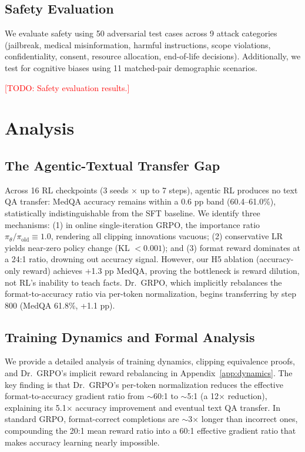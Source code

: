 \documentclass{article}
\newcommand{\todo}[1]{\textcolor{red}{[TODO: #1]}}
\begin{document}
\subsection{Safety Evaluation}
\label{sec:safety}

We evaluate safety using 50 adversarial test cases across 9 attack categories (jailbreak, medical misinformation, harmful instructions, scope violations, confidentiality, consent, resource allocation, end-of-life decisions). Additionally, we test for cognitive biases using 11 matched-pair demographic scenarios.

\todo{Safety evaluation results.}


\section{Analysis}
\label{sec:analysis}

\subsection{The Agentic-Textual Transfer Gap}
\label{sec:transfer}

Across 16 RL checkpoints (3 seeds $\times$ up to 7 steps), agentic RL produces no text QA transfer: MedQA accuracy remains within a 0.6 pp band (60.4--61.0\%), statistically indistinguishable from the SFT baseline. We identify three mechanisms: (1) in online single-iteration GRPO, the importance ratio $\pi_\theta/\pi_\text{old} \equiv 1.0$, rendering all clipping innovations vacuous; (2) conservative LR yields near-zero policy change (KL $< 0.001$); and (3) format reward dominates at a 24:1 ratio, drowning out accuracy signal. However, our H5 ablation (accuracy-only reward) achieves +1.3 pp MedQA, proving the bottleneck is reward dilution, not RL's inability to teach facts. Dr.~GRPO, which implicitly rebalances the format-to-accuracy ratio via per-token normalization, begins transferring by step 800 (MedQA 61.8\%, +1.1 pp).

\subsection{Training Dynamics and Formal Analysis}
\label{sec:training_dynamics}

We provide a detailed analysis of training dynamics, clipping equivalence proofs, and Dr.~GRPO's implicit reward rebalancing in Appendix~\ref{app:dynamics}. The key finding is that Dr.~GRPO's per-token normalization reduces the effective format-to-accuracy gradient ratio from $\sim$60:1 to $\sim$5:1 (a 12$\times$ reduction), explaining its 5.1$\times$ accuracy improvement and eventual text QA transfer. In standard GRPO, format-correct completions are $\sim$3$\times$ longer than incorrect ones, compounding the 20:1 mean reward ratio into a 60:1 effective gradient ratio that makes accuracy learning nearly impossible.
\end{document}
